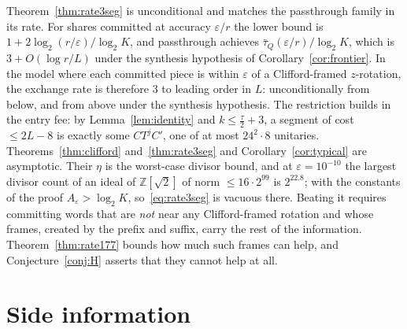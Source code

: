 \documentclass[aps,prx,twocolumn,superscriptaddress,nofootinbib,longbibliography]{revtex4-2}
\theoremstyle{plain}
\theoremstyle{definition}
\theoremstyle{remark}
\newcommand{\Z}{\mathbb{Z}}
\begin{document}
Theorem~\ref{thm:rate3seg} is unconditional and matches the passthrough family in its rate. For shares committed at accuracy $\varepsilon/r$ the lower bound is $1+2\log_2(r/\varepsilon)/\log_2K$, and passthrough achieves $\bar\tau_Q(\varepsilon/r)/\log_2K$, which is $3+O(\log r/L)$ under the synthesis hypothesis of Corollary~\ref{cor:frontier}. In the model where each committed piece is within $\varepsilon$ of a Clifford-framed $z$-rotation, the exchange rate is therefore $3$ to leading order in $L$: unconditionally from below, and from above under the synthesis hypothesis. The restriction builds in the entry fee: by Lemma~\ref{lem:identity} and $k\le\tfrac\tau2+3$, a segment of cost $\le2L-8$ is exactly some $CT^jC'$, one of at most $24^2\cdot8$ unitaries. Theorems~\ref{thm:clifford} and~\ref{thm:rate3seg} and Corollary~\ref{cor:typical} are asymptotic. Their $\eta$ is the worst-case divisor bound, and at $\varepsilon=10^{-10}$ the largest divisor count of an ideal of $\Z[\sqrt2]$ of norm $\le16\cdot2^{99}$ is $2^{22.8}$; with the constants of the proof $A_\varepsilon>\log_2K$, so~\eqref{eq:rate3seg} is vacuous there. Beating it requires committing words that are \emph{not} near any Clifford-framed rotation and whose frames, created by the prefix and suffix, carry the rest of the information. Theorem~\ref{thm:rate177} bounds how much such frames can help, and Conjecture~\ref{conj:H} asserts that they cannot help at all.

\section{Side information}\label{sec:side}
\end{document}
